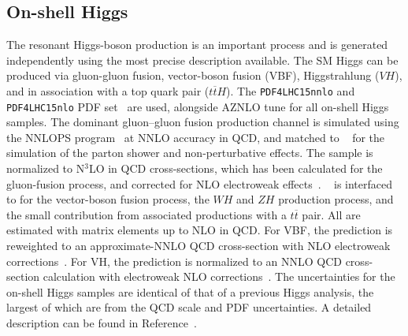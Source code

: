 \subsection{On-shell Higgs}
The resonant Higgs-boson production is an important process and is generated independently using the most precise description available. The SM Higgs can be produced via gluon-gluon fusion, vector-boson fusion (VBF), Higgstrahlung ($VH$), and in association with a top quark pair ($t\overline{t}H$). The \texttt{PDF4LHC15nnlo} and \texttt{PDF4LHC15nlo} PDF set~\cite{Butterworth:2015oua} are used, alongside AZNLO tune for all on-shell Higgs samples. The dominant gluon–gluon fusion production channel is simulated using the \powheg{} NNLOPS program~\cite{Hamilton:2013fea,Hamilton:2015nsa,Alioli:2010xd,Nason:2004rx,Frixione:2007vw} at NNLO accuracy in QCD, and matched to \pythia~\cite{Sjostrand:2014zea} for the simulation of the parton shower and non-perturbative effects. The sample is normalized to N$^3$LO in QCD cross-sections, which has been calculated for the gluon-fusion process, and corrected for NLO electroweak effects~\cite{deFlorian:2016spz,Anastasiou:2016cez,Anastasiou:2015ema,Dulat:2018rbf,Harlander:2009mq,Harlander:2009bw,Harlander:2009my,Pak:2009dg,Actis:2008ug,Actis:2008ts,Bonetti:2018ukf}. 
\powheg~\cite{Nason:2009ai,Alioli:2010xd,Nason:2004rx,Frixione:2007vw} is interfaced to \pythia{} for the vector-boson fusion process, the $WH$ and $ZH$ production process, and the small contribution from associated productions with a $t\overline{t}$ pair. All are estimated with matrix elements up to NLO in QCD. For VBF, the prediction is reweighted to an approximate-NNLO QCD cross-section with NLO electroweak corrections~\cite{Ciccolini:2007jr,Ciccolini:2007ec,Bolzoni:2010xr}. For VH, the prediction is normalized to an NNLO QCD cross-section calculation with electroweak NLO corrections~\cite{Ciccolini:2003jy,Brein:2003wg,Brein:2011vx,Denner:2014cla,Brein:2012ne}. 
The uncertainties for the on-shell Higgs samples are identical of that of a previous Higgs analysis, the largest of which are from the QCD scale and PDF uncertainties. A detailed description can be found in Reference~\cite{HIGG-2016-22}. 

